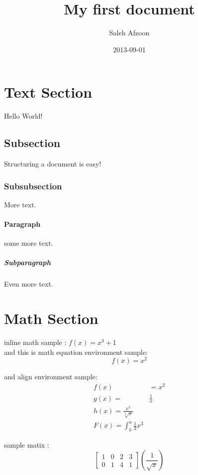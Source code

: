 \documentclass{article}
\title{My first document}
\date{2013-09-01}
\author{Saleh Afzoon}
\begin{document}
\maketitle

\newpage
  

\tableofcontents
\newpage


\section{Text Section}
Hello World!

\subsection{Subsection}
Structuring a document is easy!

\subsubsection{Subsubsection}
More text.

\paragraph{Paragraph}
some more text.

\subparagraph{Subparagraph}
Even more text.

\section{Math Section}
inline math sample : $ f(x) = x^3 +1 $ \\

and this is math equation environment sample:
\begin{equation*}
	f(x) = x^2
\end{equation*}


and align environment sample:
\begin{align*}
  f(x) &= x^2\\
  g(x) =& \frac{1}{x}\\
  h(x) = \frac{x^2}{\sqrt[3]{x}} \\
  F(x) = \int^a_b \frac{1}{3}x^3 &
\end{align*}

sample matix : 
$$
\left[
\begin{matrix}
1 & 0 & 2 & 3\\
0 & 1 & 4 & 1
\end{matrix}
\right]
\left(\frac{1}{\sqrt{x}}\right)
$$
\end{document}
